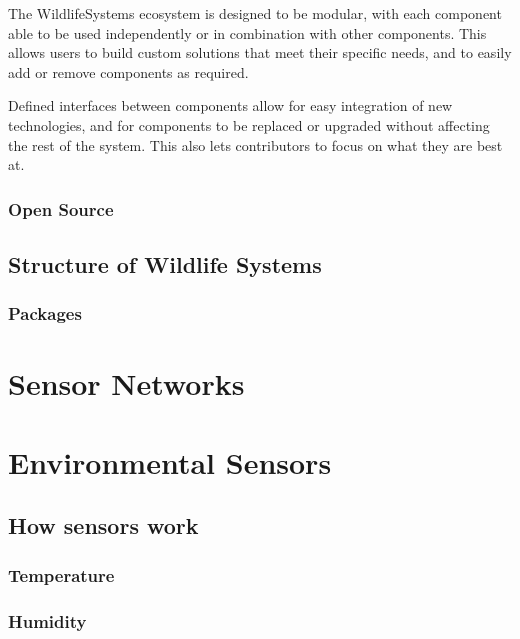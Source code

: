 \documentclass[
]{book}
\begin{document}
The WildlifeSystems ecosystem is designed to be modular, with each component able to be used independently or in combination with other components. This allows users to build custom solutions that meet their specific needs, and to easily add or remove components as required.

Defined interfaces between components allow for easy integration of new technologies, and for components to be replaced or upgraded without affecting the rest of the system. This also lets contributors to focus on what they are best at.

\subsection{Open Source}\label{open-source}

\section{Structure of Wildlife Systems}\label{structure-of-wildlife-systems}

\subsection{Packages}\label{packages}

\chapter{Sensor Networks}\label{sensor-networks}

\chapter{Environmental Sensors}\label{environmental-sensors}

\section{How sensors work}\label{how-sensors-work}

\subsection{Temperature}\label{temperature}

\subsection{Humidity}\label{humidity}
\end{document}
